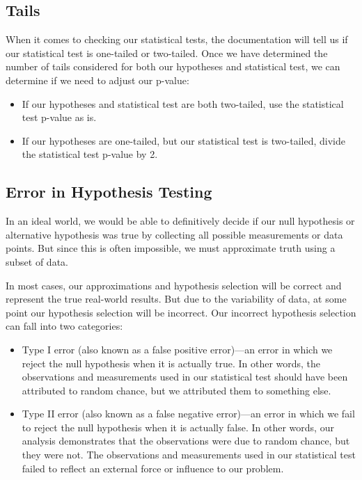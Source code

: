 \documentclass[11pt]{article}
\begin{document}
\subsection{Tails}
\label{sec:org7b99bc3}

When it comes to checking our statistical tests, the documentation will tell us if our statistical test is one-tailed or two-tailed. Once we have determined the number of tails considered for both our hypotheses and statistical test, we can determine if we need to adjust our p-value:

\begin{itemize}
\item If our hypotheses and statistical test are both two-tailed, use the statistical test p-value as is.
\item If our hypotheses are one-tailed, but our statistical test is two-tailed, divide the statistical test p-value by 2.
\end{itemize}

\subsection{Error in Hypothesis Testing}
\label{sec:orgcc8e273}

In an ideal world, we would be able to definitively decide if our null hypothesis or alternative hypothesis was true by collecting all possible measurements or data points. But since this is often impossible, we must approximate truth using a subset of data.

In most cases, our approximations and hypothesis selection will be correct and represent the true real-world results. But due to the variability of data, at some point our hypothesis selection will be incorrect. Our incorrect hypothesis selection can fall into two categories:

\begin{itemize}
\item Type I error (also known as a false positive error)—an error in which we reject the null hypothesis when it is actually true. In other words, the observations and measurements used in our statistical test should have been attributed to random chance, but we attributed them to something else.
\item Type II error (also known as a false negative error)—an error in which we fail to reject the null hypothesis when it is actually false. In other words, our analysis demonstrates that the observations were due to random chance, but they were not. The observations and measurements used in our statistical test failed to reflect an external force or influence to our problem.
\end{itemize}
\end{document}
